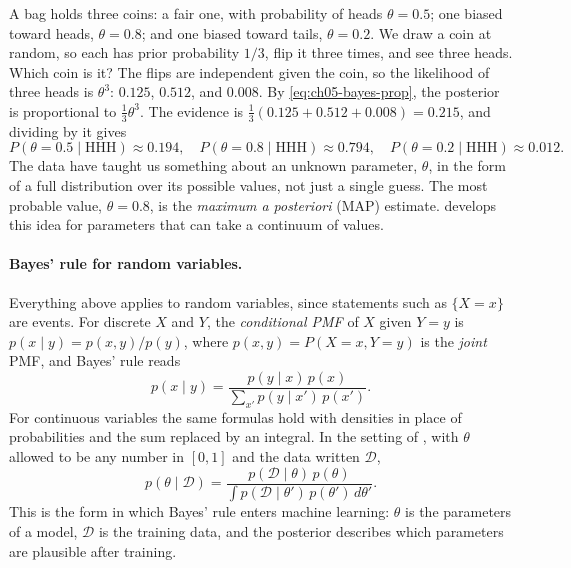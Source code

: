 \begin{example}
  \label{ex:ch05-coins}
  A bag holds three coins: a fair one, with probability of heads $\theta
  = 0.5$; one biased toward heads, $\theta = 0.8$; and one biased toward
  tails, $\theta = 0.2$. We draw a coin at random, so each has prior
  probability $1/3$, flip it three times, and see three heads. Which coin
  is it? The flips are independent given the coin, so the likelihood of
  three heads is $\theta^3$: $0.125$, $0.512$, and $0.008$. By
  \cref{eq:ch05-bayes-prop}, the posterior is proportional to $\frac13
  \theta^3$. The evidence is $\frac13(0.125 + 0.512 + 0.008) = 0.215$,
  and dividing by it gives
  \[
    P(\theta = 0.5 \mid \text{HHH}) \approx 0.194, \quad
    P(\theta = 0.8 \mid \text{HHH}) \approx 0.794, \quad
    P(\theta = 0.2 \mid \text{HHH}) \approx 0.012 .
  \]
  The data have taught us something about an unknown parameter, $\theta$,
  in the form of a full distribution over its possible values, not just
  a single guess. The most probable value, $\theta = 0.8$, is the
  \emph{maximum a posteriori} (MAP) estimate.  develops
  this idea for parameters that can take a continuum of values.
\end{example}

\paragraph{Bayes' rule for random variables.}
Everything above applies to random variables, since statements such as
$\{X = x\}$ are events. For discrete $X$ and $Y$, the \emph{conditional
PMF} of $X$ given $Y = y$ is $p(x \mid y) = p(x, y)/p(y)$, where $p(x, y)
= P(X = x, Y = y)$ is the \emph{joint} PMF, and Bayes' rule reads
\[
  p(x \mid y) = \frac{p(y \mid x)\, p(x)}{\sum_{x'} p(y \mid x')\, p(x')} .
\]
For continuous variables the same formulas hold with densities in place
of probabilities and the sum replaced by an integral. In the setting of
, with $\theta$ allowed to be any number in $[0, 1]$
and the data written $\mathcal{D}$,
\[
  p(\theta \mid \mathcal{D})
  = \frac{p(\mathcal{D} \mid \theta)\, p(\theta)}
         {\int p(\mathcal{D} \mid \theta')\, p(\theta')\, d\theta'} .
\]
This is the form in which Bayes' rule enters machine learning: $\theta$
is the parameters of a model, $\mathcal{D}$ is the training data, and
the posterior describes which parameters are plausible after training.

